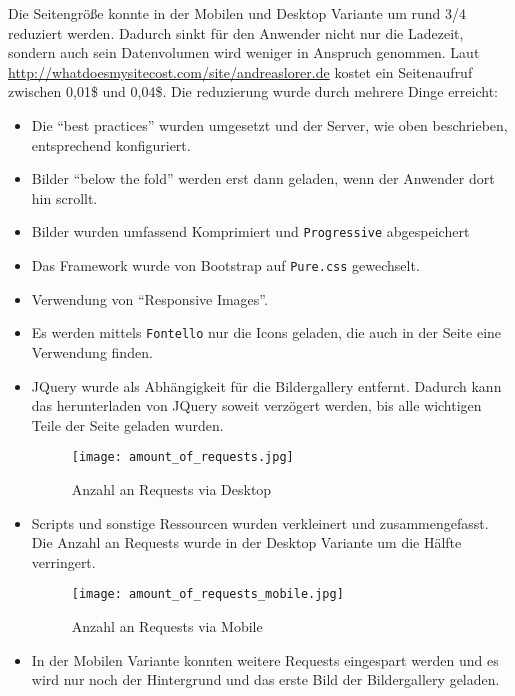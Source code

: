 		Die Seitengröße konnte in der Mobilen und Desktop Variante um rund 3/4 reduziert werden. Dadurch sinkt für den Anwender nicht nur die Ladezeit, sondern auch sein Datenvolumen wird weniger in Anspruch genommen. Laut \url{http://whatdoesmysitecost.com/site/andreaslorer.de} kostet ein Seitenaufruf zwischen 0,01\$ und 0,04\$. Die reduzierung wurde durch mehrere Dinge erreicht: 
		\begin{itemize}
			\item Die "`best practices"' wurden umgesetzt und der Server, wie oben beschrieben, entsprechend konfiguriert.
			\item Bilder "`below the fold"' werden erst dann geladen, wenn der Anwender dort hin scrollt.
			\item Bilder wurden umfassend Komprimiert und \texttt{Progressive} abgespeichert
			\item Das Framework wurde von Bootstrap auf \texttt{Pure.css} gewechselt.
			\item Verwendung von "`Responsive Images"'.
			\item Es werden mittels \texttt{Fontello} nur die Icons geladen, die auch in der Seite eine Verwendung finden.
			\item JQuery wurde als Abhängigkeit für die Bildergallery entfernt. Dadurch kann das herunterladen von JQuery soweit verzögert werden, bis alle wichtigen Teile der Seite geladen wurden. 
			\begin{figure}[htbp]
				\begin{center}
					\texttt{[image: amount\_of\_requests.jpg]}
					\caption{Anzahl an Requests via Desktop}
					\label{fig:amount_of_requests}
				\end{center}
			\end{figure}
			\item Scripts und sonstige Ressourcen wurden verkleinert und zusammengefasst. Die Anzahl an Requests wurde in der Desktop Variante um die Hälfte verringert.

			\begin{figure}[htbp]
				\begin{center}
					\texttt{[image: amount\_of\_requests\_mobile.jpg]}
					\caption{Anzahl an Requests via Mobile}
					\label{fig:amount_of_requests_mobile}
				\end{center}
	    \end{figure}

			\item In der Mobilen Variante konnten weitere Requests eingespart werden und es wird nur noch der Hintergrund und das erste Bild der Bildergallery geladen.
		\end{itemize}

